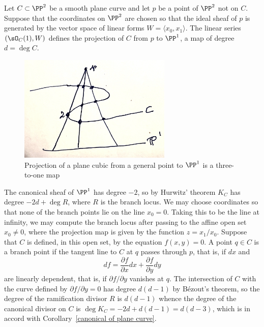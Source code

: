 \begin{example}
Let $C\subset \PP^2$ be a smooth plane curve and let $p$ be a point of $\PP^2$ not on $C$. Suppose that the coordinates on $\PP^2$ are chosen so that the ideal sheaf of $p$ is  
 generated by the vector space of linear forms $W = \langle x_0,x_1\rangle$. 
The linear series $(\sO_C(1), W)$ defines the projection of $C$ from $p$ to $\PP^1$, a map of degree
$d = \deg C$.
\begin{figure}
 \caption{Projection of a plane cubic from a general point to $\PP^1$ is a three-to-one map}
\centerline {\includegraphics[height=2in]{"projectionPlaneCubic"}}
\end{figure}

The canonical sheaf of $\PP^1$ has degree $-2$, so by Hurwitz' theorem
$K_C$ has degree $ -2d+ \deg R$, where $R$ is the branch locus. We may choose coordinates
so that none of the branch points lie on the line $x_0 = 0$. Taking this to be the line at infinity, we
may compute the branch locus after passing to the affine open set $x_0\neq 0$, where the projection
map is given by the function $z = x_1/x_0$.  Suppose that $C$ is defined, in this open set,
by the equation $f(x,y)= 0$. A point $q\in C$ is a branch point if the tangent line to $C$ at $q$
passes through $p$, that is, if $dx$  and 
$$
df = \frac{\partial f}{\partial x} dx + \frac{\partial f}{\partial y} dy
$$
are linearly dependent, that is, if $\partial f/{\partial y}$ vanishes at $q$. The intersection of 
$C$ with the curve defined by $\partial f/{\partial y}=0$ has degree $d(d-1)$ by B\'ezout's theorem,
so the degree of the ramification divisor $R$ is $d(d-1)$ whence the degree of the canonical
divisor on $C$ is $\deg K_C = -2d+d(d-1) = d(d-3)$, which is in accord with 
Corollary~\ref{canonical of plane curve}.

\end{example}

